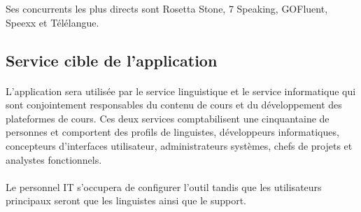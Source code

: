 Ses concurrents les plus directs sont Rosetta Stone, 7 Speaking, GOFluent, Speexx et Télélangue.

\subsection{Service cible de l'application}
\label{ssec:target-service}
\paragraph{}
L'application sera utilisée par le service linguistique et le service informatique qui sont conjointement responsables du contenu de cours
et du développement des plateformes de cours.
Ces deux services comptabilisent une cinquantaine de personnes et comportent des profils de linguistes, développeurs informatiques,
concepteurs d'interfaces utilisateur, administrateurs systèmes, chefs de projets et analystes fonctionnels.

\paragraph{}
Le personnel IT s'occupera de configurer l'outil tandis que les utilisateurs principaux seront que les linguistes ainsi que le support.
